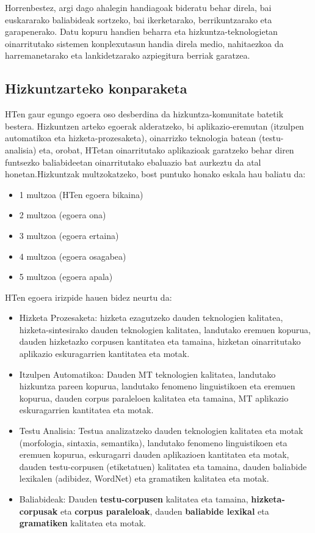 \begin{multicols}{2}
Horrenbestez, argi dago ahalegin handiagoak bideratu behar direla, bai euskararako baliabideak sortzeko, bai ikerketarako, berrikuntzarako eta garapenerako. Datu kopuru handien beharra eta hizkuntza-teknologietan oinarritutako sistemen konplexutasun handia direla medio, nahitaezkoa da harremanetarako eta lankidetzarako azpiegitura berriak garatzea.

\subsection{Hizkuntzarteko konparaketa}
    HTen gaur egungo egoera oso desberdina da hizkuntza-komunitate batetik bestera. Hizkuntzen arteko egoerak alderatzeko, bi aplikazio-eremutan (itzulpen automatikoa eta hizketa-prozesaketa), oinarrizko teknologia batean (testu-analisia) eta, orobat, HTetan oinarritutako aplikazioak garatzeko behar diren funtsezko baliabideetan oinarritutako ebaluazio bat aurkeztu da atal honetan.Hizkuntzak multzokatzeko, bost puntuko honako eskala hau baliatu da:
\begin{itemize}
\item 1 multzoa (HTen egoera bikaina)
\item 2 multzoa (egoera ona)
\item 3 multzoa (egoera ertaina)
\item 4 multzoa (egoera osagabea)
\item 5 multzoa (egoera apala)
\end{itemize}
HTen egoera irizpide hauen bidez neurtu da:
\begin{itemize}
\item Hizketa Prozesaketa: hizketa ezagutzeko dauden teknologien kalitatea, hizketa-sintesirako dauden teknologien kalitatea, landutako eremuen kopurua, dauden hizketazko corpusen kantitatea eta tamaina, hizketan oinarritutako aplikazio eskuragarrien kantitatea eta motak.
\item Itzulpen Automatikoa: Dauden MT teknologien kalitatea, landutako hizkuntza pareen kopurua, landutako fenomeno linguistikoen eta eremuen kopurua, dauden corpus paraleloen kalitatea eta tamaina, MT aplikazio eskuragarrien kantitatea eta motak.
\item Testu Analisia: Testua analizatzeko dauden teknologien kalitatea eta motak (morfologia, sintaxia, semantika), landutako fenomeno linguistikoen eta eremuen kopurua, eskuragarri dauden aplikazioen kantitatea eta motak, dauden testu-corpusen (etiketatuen) kalitatea eta tamaina, dauden baliabide lexikalen (adibidez, WordNet) eta gramatiken kalitatea eta motak.
\item Baliabideak: Dauden \textbf{testu-corpusen} kalitatea eta tamaina, \textbf{hizketa-corpusak} eta \textbf{corpus paraleloak}, dauden \textbf{baliabide lexikal} eta \textbf{gramatiken} kalitatea eta motak.
\end{itemize} 



\end{multicols}
